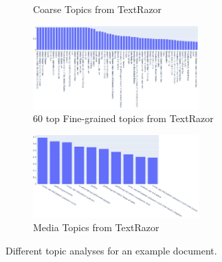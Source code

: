 \begin{figure}
\begin{subfigure}{0.45\textwidth}
		\caption{Coarse Topics from TextRazor} %
            \label{fig:topic_analysis_different_tools_coarse} 
	\end{subfigure}
	\begin{subfigure}{\textwidth} %
		\centering\includegraphics[width=0.7\textwidth]{figures/finegrained_topics.pdf}
		\caption{60 top Fine-grained topics from TextRazor} %
            \label{fig:topic_analysis_different_tools_fine} 
	\end{subfigure}
	\begin{subfigure}{\textwidth} %
		\centering\includegraphics[width=0.7\textwidth]{figures/mediatopics.pdf}
		\caption{Media Topics from TextRazor} %
            \label{fig:topic_analysis_different_tools_mediatopics} 
	\end{subfigure}
    \caption{Different topic analyses for an example document.}
    \label{fig:topic_analysis_different_tools} 
\end{figure}

